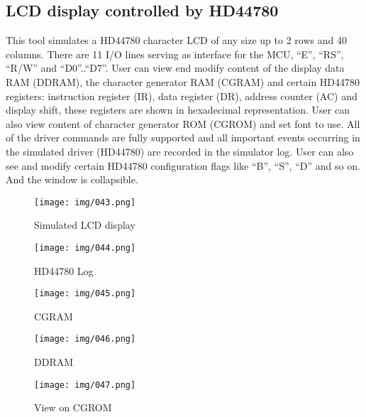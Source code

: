 \documentclass[a4paper,twoside,12pt]{book}
\begin{document}
		\subsection{LCD display controlled by HD44780}
			This tool simulates a HD44780 character LCD of any size up to 2 rows and 40 columns. There are 11 I/O lines serving as interface for the MCU, ``E'', ``RS'', ``R/W'' and ``D0''..``D7''. User can view end modify content of the display data RAM (DDRAM), the character generator RAM (CGRAM) and certain HD44780 registers: instruction register (IR), data register (DR), address counter (AC) and display shift, these registers are shown in hexadecimal representation.
			User can also view content of character generator ROM (CGROM) and set font to use. All of the driver commands are fully supported and all important events occurring in the simulated driver (HD44780) are recorded in the simulator log. User can also see and modify certain HD44780 configuration flags like ``B'', ``S'', ``D'' and so on. And the window is collapsible.
			\begin{figure}[h!]
				\begin{minipage}[b]{.5\textwidth}
					\begin{minipage}[b]{\textwidth}
						\centering{}
						\texttt{[image: img/043.png]}
						\caption{Simulated LCD display}
					\end{minipage}

					\begin{minipage}[b]{\textwidth}
						\centering{}
						\texttt{[image: img/044.png]}
						\caption{HD44780 Log}
					\end{minipage}

					\begin{minipage}[b]{\textwidth}
						\begin{minipage}[b]{.45\textwidth}
							\centering{}
							\texttt{[image: img/045.png]}
							\caption{CGRAM}
						\end{minipage}
						\begin{minipage}[b]{.45\textwidth}
							\centering{}
							\texttt{[image: img/046.png]}
							\caption{DDRAM}
						\end{minipage}
					\end{minipage}
				\end{minipage}
				\begin{minipage}[b]{.5\textwidth}
					\centering{}
					\texttt{[image: img/047.png]}
					\caption{View on CGROM}
				\end{minipage}
			\end{figure}
\end{document}
